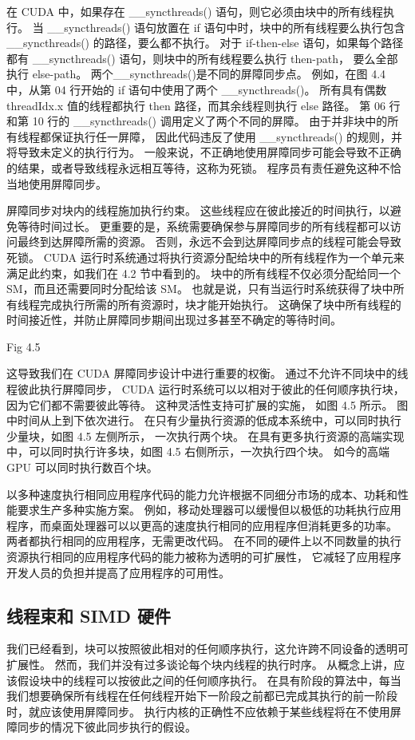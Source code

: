 在 CUDA 中，如果存在 \_\_syncthreads() 语句，则它必须由块中的所有线程执行。 
当 \_\_syncthreads() 语句放置在 if 语句中时，块中的所有线程要么执行包含 \_\_syncthreads() 的路径，要么都不执行。 
对于 if-then-else 语句，如果每个路径都有 \_\_syncthreads() 语句，则块中的所有线程要么执行 then-path，
要么全部执行 else-path。 两个\_\_syncthreads()是不同的屏障同步点。 
例如，在图 4.4 中，从第 04 行开始的 if 语句中使用了两个 \_\_syncthreads()。
所有具有偶数 threadIdx.x 值的线程都执行 then 路径，而其余线程则执行 else 路径。 
第 06 行和第 10 行的 \_\_syncthreads() 调用定义了两个不同的屏障。 由于并非块中的所有线程都保证执行任一屏障，
因此代码违反了使用 \_\_syncthreads() 的规则，并将导致未定义的执行行为。 
一般来说，不正确地使用屏障同步可能会导致不正确的结果，或者导致线程永远相互等待，这称为死锁。 
程序员有责任避免这种不恰当地使用屏障同步。

屏障同步对块内的线程施加执行约束。 这些线程应在彼此接近的时间执行，以避免等待时间过长。 
更重要的是，系统需要确保参与屏障同步的所有线程都可以访问最终到达屏障所需的资源。 
否则，永远不会到达屏障同步点的线程可能会导致死锁。 
CUDA 运行时系统通过将执行资源分配给块中的所有线程作为一个单元来满足此约束，如我们在 4.2 节中看到的。 
块中的所有线程不仅必须分配给同一个 SM，而且还需要同时分配给该 SM。 
也就是说，只有当运行时系统获得了块中所有线程完成执行所需的所有资源时，块才能开始执行。 
这确保了块中所有线程的时间接近性，并防止屏障同步期间出现过多甚至不确定的等待时间。

{\color{red} Fig 4.5}

这导致我们在 CUDA 屏障同步设计中进行重要的权衡。 通过不允许不同块中的线程彼此执行屏障同步，
CUDA 运行时系统可以以相对于彼此的任何顺序执行块，因为它们都不需要彼此等待。 这种灵活性支持可扩展的实施，
如图 4.5 所示。 图中时间从上到下依次进行。 在只有少量执行资源的低成本系统中，可以同时执行少量块，如图 4.5 左侧所示，
一次执行两个块。 在具有更多执行资源的高端实现中，可以同时执行许多块，如图 4.5 右侧所示，一次执行四个块。 
如今的高端 GPU 可以同时执行数百个块。

以多种速度执行相同应用程序代码的能力允许根据不同细分市场的成本、功耗和性能要求生产多种实施方案。 
例如，移动处理器可以缓慢但以极低的功耗执行应用程序，而桌面处理器可以以更高的速度执行相同的应用程序但消耗更多的功率。 
两者都执行相同的应用程序，无需更改代码。 
在不同的硬件上以不同数量的执行资源执行相同的应用程序代码的能力被称为透明的可扩展性，
它减轻了应用程序开发人员的负担并提高了应用程序的可用性。

\subsection{线程束和 SIMD 硬件}
我们已经看到，块可以按照彼此相对的任何顺序执行，这允许跨不同设备的透明可扩展性。 
然而，我们并没有过多谈论每个块内线程的执行时序。 从概念上讲，应该假设块中的线程可以按彼此之间的任何顺序执行。 
在具有阶段的算法中，每当我们想要确保所有线程在任何线程开始下一阶段之前都已完成其执行的前一阶段时，就应该使用屏障同步。 
执行内核的正确性不应依赖于某些线程将在不使用屏障同步的情况下彼此同步执行的假设。

